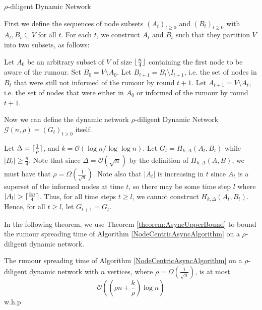 \begin{definition}
	$\rho$-diligent Dynamic Network
	
	First we define the sequences of node subsets $(A_t)_{t\geq 0}$ and $(B_t)_{t\geq0}$ with $A_t, B_t \subseteq V$ for all $t$. For each $t$, we construct $A_t$ and $B_t$ such that they partition $V$ into two subsets, as follows:

	Let $A_0$ be an arbitrary subset of $V$ of size $\lfloor\frac{n}{4}\rfloor$ containing the first node to be aware of the rumour. %
	Set $B_0 = V \setminus A_0$. Let $B_{t+1} = B_t \setminus I_{t+1}$, i.e. the set of nodes in $B_t$ that were still not informed of the rumour by round $t+1$. %
	Let $A_{t+1} = V \setminus A_t$, i.e. the set of nodes that were either in $A_0$ or informed of the rumour by round $t+1$.

	Now we can define the dynamic network $\rho$-diligent Dynamic Network $\mathcal{G}(n, \rho) = (G_t)_{t\geq 0}$ itself. 

	Let $\Delta = \lceil\frac{1}{\rho}\rceil$, and $k = \mathcal{O}(\log n / \log \log n)$.
	Let $G_t = H_{k, \Delta}(A_t, B_t)$ while $|B_t| \geq \frac{n}{4}$. Note that since $\Delta = \mathcal{O}(\sqrt{n})$ by the definition of $H_{k, \Delta}(A,B)$, we must have that $\rho = \Omega\left(\frac{1}{\sqrt{n}}\right)$.
	Note also that $|A_t|$ is increasing in $t$ since $A_t$ is a superset of the informed nodes at time $t$, so there may be some time step $l$ where $|A_l| > \lceil\frac{3n}{4}\rceil$. Thus, for all time steps $t \geq l$, we cannot construct $H_{k, \Delta}(A_t,B_t)$. Hence, for all $t \geq l$, let $G_{t+1} = G_t$.
\end{definition}

In the following theorem, we use Theorem \ref{theorem:AsyncUpperBound} to bound the rumour spreading time of Algorithm \ref{NodeCentricAsyncAlgorithm} on a $\rho$-diligent dynamic network.

\begin{theorem}
	The rumour spreading time of Algorithm \ref{NodeCentricAsyncAlgorithm} on a $\rho$-diligent dynamic network with $n$ vertices, where $\rho = \Omega(\frac{1}{\sqrt{n}})$, is at most 
	$$
		\mathcal{O}\left(\left(\rho n + \frac{k}{\rho}\right)\log n\right)
	$$
	w.h.p
\end{theorem}

